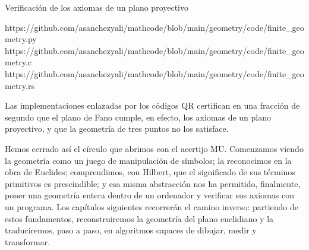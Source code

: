 \begin{algorithmbox}{Verificación de los axiomas de un plano proyectivo}
    \label{alg:plano_proyectivo}
    \begin{minipage}[t]{\dimexpr\linewidth-2cm\relax}
        \begin{algorithm}[H]
            \DontPrintSemicolon
            \SetAlgoVlined
            \BlankLine
            \BlankLine
            \BlankLine
            \BlankLine
            \;
        \end{algorithm}
    \end{minipage}%
    \hfill
    \codeqrsidebar
    {https://github.com/asanchezyali/mathcode/blob/main/geometry/code/finite_geometry.py}
    {https://github.com/asanchezyali/mathcode/blob/main/geometry/code/finite_geometry.c}
    {https://github.com/asanchezyali/mathcode/blob/main/geometry/code/finite_geometry.rs}
\end{algorithmbox}

Las implementaciones enlazadas por los códigos QR certifican en una fracción de segundo que el plano de Fano cumple, en
efecto, los axiomas de un plano proyectivo, y que la geometría de tres puntos no los satisface.

Hemos cerrado así el círculo que abrimos con el acertijo MU. Comenzamos viendo la geometría como un juego de
manipulación de símbolos; la reconocimos en la obra de Euclides; comprendimos, con Hilbert, que el significado de sus
términos primitivos es prescindible; y esa misma abstracción nos ha permitido, finalmente, poner una geometría entera
dentro de un ordenador y verificar sus axiomas con un programa. Los capítulos siguientes recorrerán el camino inverso:
partiendo de estos fundamentos, reconstruiremos la geometría del plano euclidiano y la traduciremos, paso a paso, en
algoritmos capaces de dibujar, medir y transformar.

